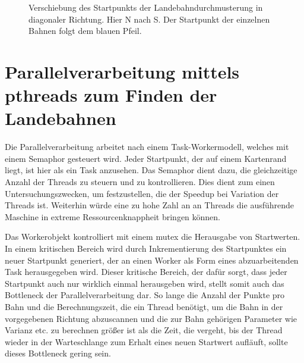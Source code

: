 \documentclass[10pt,a4paper]{report}
\begin{document}
\begin{figure}\label{scanortho}
\centering
{}
\caption{Verschiebung des Startpunkts der Landebahndurchmusterung in diagonaler Richtung. Hier N nach S. Der Startpunkt der einzelnen Bahnen folgt dem blauen Pfeil.}
\end{figure}
\section{Parallelverarbeitung mittels pthreads zum Finden der Landebahnen}

Die Parallelverarbeitung arbeitet nach einem Task-Workermodell, welches mit einem Semaphor gesteuert wird. Jeder Startpunkt, der auf einem Kartenrand liegt, ist hier als ein Task anzusehen. Das Semaphor dient dazu, die gleichzeitige Anzahl der Threads zu steuern und zu kontrollieren. Dies dient zum einen Untersuchungszwecken, um festzustellen, die der Speedup bei Variation der Threads ist. Weiterhin würde eine zu hohe Zahl an an Threads die ausführende Maschine in extreme Ressourcenknappheit bringen können.

Das Workerobjekt kontrolliert mit einem mutex die Herausgabe von Startwerten. In einem kritischen Bereich wird durch Inkrementierung des Startpunktes ein neuer Startpunkt generiert, der an einen Worker als Form eines abzuarbeitenden Task herausgegeben wird. Dieser kritische Bereich, der dafür sorgt, dass jeder Startpunkt auch nur wirklich einmal herausgeben wird, stellt somit auch das Bottleneck der Parallelverarbeitung dar. So lange die Anzahl der Punkte pro Bahn und die Berechnungszeit, die ein Thread benötigt, um die Bahn in der vorgegebenen Richtung abzuscannen und die zur Bahn gehörigen Parameter wie Varianz etc. zu berechnen größer ist als die Zeit, die vergeht, bis der Thread wieder in der Warteschlange zum Erhalt eines neuen Startwert aufläuft, sollte dieses Bottleneck gering sein.
\end{document}
